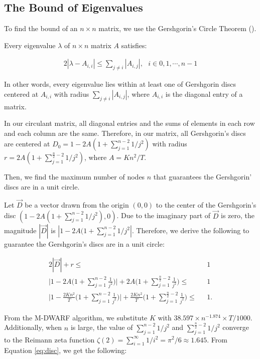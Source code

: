 \subsection{The Bound of Eigenvalues}
\label{sec:bound-mhop}
To find the bound of an $n \times n$ matrix, we use the Gershgorin's Circle Theorem (\cite{gersh_eng, gersh_ger}).

\begin{thm}
Every eigenvalue $\lambda$ of $n \times n$ matrix $A$ satisfies:

\begin{alignat}{2}
|\lambda - A_{i,i}| \leq \sum_{j \neq i} |A_{i,j}|, \text{ } i \in {0,1,\cdots, n-1} \nonumber
\end{alignat}
\end{thm}

In other words, every eigenvalue lies within at least one of Gershgorin discs centered at $A_{i,i}$ with radius $\sum_{j \neq i} |A_{i,j}|$, where $A_{i,i}$ is the diagonal entry of a matrix.

In our circulant matrix, all diagonal entries and the sums of elements in each row and each column are the same. Therefore, in our matrix, all Gershgorin's discs are centered at $D_0 = 1 - 2A(1 + \sum_{j=1}^{n-2}1/j^2)$ with radius $r = 2A(1 + \sum_{j=1}^{\frac{n}{2}-2}1/j^2)$, where $A = Kn^2/T$.

Then, we find the maximum number of nodes $n$ that guarantees the Gershgorin' discs are in a unit circle.

Let $\vec{D}$ be a vector drawn from the origin $(0,0)$ to the center of the Gershgorin's disc $(1 - 2A(1 + \sum_{j=1}^{n-2}1/j^2), 0)$. Due to the imaginary part of $\vec{D}$ is zero, the magnitude $|\vec{D}|$ is $|1 - 2A(1 + \sum_{j=1}^{n-2}1/j^2|$. Therefore, we derive the following to guarantee the Gershgorin's discs are in a unit circle:

\begin{alignat}{2}
|\vec{D}| + r \leq& \text{ } 1 \nonumber \\
\Bigg|1 - 2A\Bigg(1 + \sum_{j=1}^{n-2}\frac{1}{j^2}\Bigg)\Bigg| + 2A\Bigg(1 + \sum_{j=1}^{\frac{n}{2}-2}\frac{1}{j^2}\Bigg) \leq& \text{ } 1 \nonumber \\
\Bigg|1 - \frac{2Kn^2}{T}\Bigg(1 + \sum_{j=1}^{n-2}\frac{1}{j^2}\Bigg)\Bigg| + \frac{2Kn^2}{T}\Bigg(1 + \sum_{j=1}^{\frac{n}{2}-2}\frac{1}{j^2}\Bigg) \leq& \text{ } 1.
\label{eq:disc}
\end{alignat}

From the M-DWARF algorithm, we substitute $K$ with $38.597 \times n^{-1.874} \times T/1000$. Additionally, when $n$ is large, the value of $\sum_{j=1}^{n-2} 1/j^2$ and $\sum_{j=1}^{\frac{n}{2}-2}1/j^2$ converge to the Reimann zeta function $\zeta (2) = \sum_{i=1}^{\infty}1/i^2 = \pi^2/6 \approx 1.645$. From Equation \ref{eq:disc}, we get the following:

